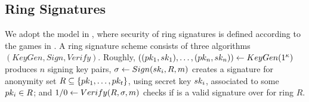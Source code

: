   





\subsection{Ring Signatures}
\label{sapp:related-models-rs}

We adopt the model in \cite{bkm06}, where security of ring signatures is
defined according to the games in . A ring signature
scheme consists of three algorithms $(KeyGen,Sign,Verify)$. Roughly,
$((pk_1,sk_1),\dots,(pk_n,sk_n)) \gets KeyGen(1^\kappa)$ produces $n$
signing key pairs, $\sigma \gets Sign(sk_i,R,m)$ creates a signature for
anonymity set $R \subseteq \lbrace pk_1, \dots, pk_t \rbrace$, using secret
key $sk_i$, associated to some $pk_i \in R$; and $1/0 \gets Verify(R,\sigma,
m)$ checks if \sig is a valid signature over \msg for ring $R$.

